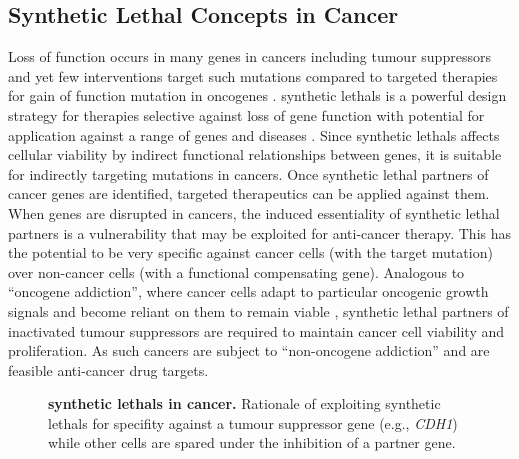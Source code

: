 \subsection{Synthetic Lethal Concepts in Cancer}

Loss of function occurs in many genes in cancers including tumour suppressors and yet few interventions target such mutations compared to targeted therapies for gain of function mutation in oncogenes \citep{Kaelin2005}. \Glspl{synthetic lethal} is a powerful design strategy for therapies selective against loss of gene function with potential for application against a range of genes and diseases \citep{Kaelin2009, Fece2015}. Since \glspl{synthetic lethal} affects cellular viability by indirect functional relationships between genes, it is suitable for indirectly targeting mutations in cancers. Once \gls{synthetic lethal} partners of cancer genes are identified, targeted therapeutics can be applied against them. When genes are disrupted in cancers, the induced essentiality of \gls{synthetic lethal} partners is a vulnerability that may be exploited for anti-cancer therapy. This has the potential to be very specific against cancer cells (with the target mutation) over non-cancer cells (with a functional compensating gene). Analogous to ``oncogene addiction'', where cancer cells adapt to particular oncogenic growth signals and become reliant on them to remain viable \citep{Luo2009, Weinstein2000}, \gls{synthetic lethal} partners of inactivated tumour suppressors are required to maintain cancer cell viability and proliferation. As such cancers are subject to ``non-oncogene addiction'' and are feasible anti-cancer drug targets. 


\begin{figure}[!ht]
\begin{mdframed}
      \caption[\Glspl{synthetic lethal} in cancer]{\small \textbf{\Glspl{synthetic lethal} in cancer.} Rationale of exploiting \glspl{synthetic lethal} for specifity against a tumour suppressor gene (e.g.,  \textit{CDH1}) while other cells are spared under the inhibition of a partner gene.}
\label{fig:SL_Concept}
\end{mdframed}
\end{figure}

